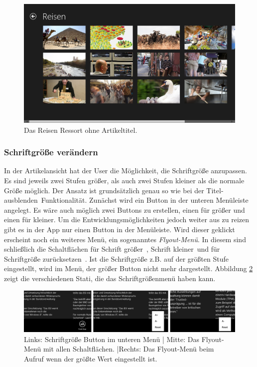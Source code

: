 \documentclass[12pt,a4paper,bibtotoc,abstracton]{scrartcl}
\begin{document}
\begin{figure}[h]
	\centering
	\includegraphics[width=\textwidth]{Bilder/Screenshots/app/reise_aegypten_3gdohne.png} 
	\caption{Das Reisen Ressort ohne Artikeltitel.}
	\label{fig:ressortohnetitel}
\end{figure}

\subsubsection{Schriftgröße verändern}
\label{subsubsec:schriftgroesseveraendern}
In der Artikelansicht hat der User die Möglichkeit, die Schriftgröße anzupassen. Es sind jeweils zwei Stufen größer, als auch zwei Stufen kleiner als die normale Größe möglich. Der  Ansatz ist grundsätzlich genau so wie bei der \glqq Titel-ausblenden\grqq\ Funktionalität. Zunächst wird ein Button in der unteren Menüleiste angelegt. Es wäre auch möglich zwei Buttons zu erstellen, einen für größer und einen für kleiner. Um die Entwicklungsmöglichkeiten jedoch weiter aus zu reizen gibt es in der App nur einen Button in der Menüleiste. Wird dieser geklickt erscheint noch ein weiteres Menü, ein sogenanntes \textit{Flyout-Menü}. In diesem sind schließlich die Schaltflächen für \glqq Schrift größer\grqq\ , \glqq Schrift kleiner\grqq\ und für \glqq Schriftgröße zurücksetzen\grqq\ . Ist die Schriftgröße z.B. auf der größten Stufe eingestellt, wird im Menü, der größer Button nicht mehr dargestellt. Abbildung \ref{fig:fontsizemenü} zeigt die verschiedenen Stati, die das Schriftgrößenmenü haben kann.

\begin{figure}[h]
	\centering
	\includegraphics[width=\textwidth]{Bilder/Screenshots/app/font_size_menu_kompakt.png} 
	\caption[Schriftgröße verändern]{Links: Schriftgröße Button im unteren Menü | Mitte: Das Flyout-Menü mit allen Schaltflächen. |Rechts: Das Flyout-Menü beim Aufruf wenn der größte Wert eingestellt ist.}
	\label{fig:fontsizemenü}
\end{figure} 
\end{document}
